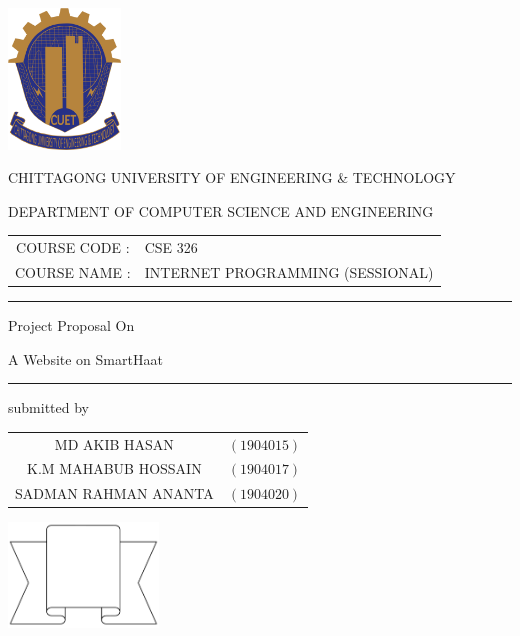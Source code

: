 \documentclass[a4paper,12pt]{report}
\begin{document}
\begin{titlepage}

	\centering

	\includegraphics[width=3cm, keepaspectratio]{cuet.png} \par \vspace{0.5cm}
	\begin{Large}
		CHITTAGONG UNIVERSITY OF ENGINEERING \& TECHNOLOGY
	\end{Large}
	\par
	\vspace{.5cm}
	{DEPARTMENT OF COMPUTER SCIENCE AND ENGINEERING}
	\vspace{3cm}

	\begin{tabular}{cl}
		COURSE CODE : & CSE 326                          \\
		COURSE NAME : & INTERNET PROGRAMMING (SESSIONAL)
	\end{tabular}
	\vspace{0.5cm}

	\raisebox{-\baselineskip}{\rule{\textwidth}{1px}}
	\rule{\textwidth}{1px}

	{\Large{{Project Proposal On}}}\par \vspace{0.5cm}
\huge{{A Website on SmartHaat}}
	\rule{\textwidth}{2px}

	\vspace{1cm}
	\normalsize

	\parbox[l]{9cm}{
		\begin{center}
			submitted by
		\end{center}

		\begin{tabular}{cl}
			MD AKIB HASAN        & $(1904015)$ \\
			K.M MAHABUB HOSSAIN  & $(1904017)$ \\
			SADMAN RAHMAN ANANTA & $(1904020)$ \\
		\end{tabular}
	}
	\parbox[r]{7cm}{
		\vspace{1cm}
		\begin{center}
			\includegraphics[width=4cm, keepaspectratio]{remarks.png}
		\end{center}
	}


\end{titlepage}
\end{document}
